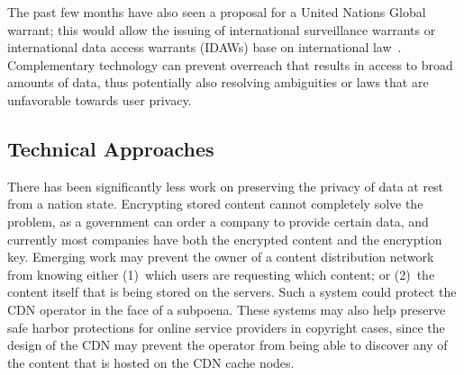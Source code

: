 The past few months have also seen a proposal for a United Nations Global
warrant; this would allow the issuing of international surveillance warrants
or international data access warrants (IDAWs) base on international
law~\cite{global_warrant}.  Complementary technology can prevent 
overreach that results in access to broad amounts of data, thus potentially also
resolving ambiguities or laws that are unfavorable towards user privacy.


\subsection{Technical Approaches}
\label{sec:tech_rest}

There has been significantly less work on preserving the privacy of data at
rest from a nation state. Encrypting stored content cannot completely solve
the problem, as a government can order a company to provide certain data, and
currently most companies have both the encrypted content and the encryption
key.  Emerging work may prevent the owner of a content distribution network
from knowing either (1)~which users are requesting which content; or (2)~the content
itself that is being stored on the servers. Such a system could protect the CDN
operator in the face of a subpoena. These systems may also help preserve safe harbor
protections for online service providers in copyright cases, since the design of
the CDN may prevent the operator from being able to discover any of the content
that is hosted on the CDN cache nodes.




